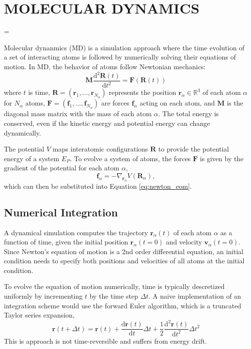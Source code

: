 \chapter{MOLECULAR DYNAMICS}
\label{ch:md}
\hfuzz=20pt
\vfuzz=20pt
\vbadness=\maxdimen

Molecular dynanmics (MD) is a simulation approach where the time evolution of a set of interacting atoms is followed by numerically solving their equations of motion.  In MD, the behavior of atoms follow Newtonian mechanics:
\begin{equation}
	  \label{eq:newton_eom}
    \bm{M}\frac{\mathrm{d}^2\bm{R}(t)}
		           {\mathrm{d} t^2}
		=
		\bm{F}(\bm{R}(t))
\end{equation}
where $t$ is time,
$\bm{R} = (\bm{r}_1,...,\bm{r}_{N_\alpha})$ represents the position $\bm{r}_\alpha \in \mathbb{R}^3$ of each atom $\alpha$ for $N_\alpha$ atoms,
$\bm{F} = (\bm{f}_1,...,\bm{f}_{N_\alpha})$ are forces $\bm{f}_\alpha$ acting on each atom,
and $\bm{M}$ is the diagonal mass matrix with the mass of each atom $\alpha$.
The total energy is conserved, even if the kinetic energy and potential energy can change dynamically.

The potential $V$ maps interatomic configurations $\bm{R}$ to provide the potential energy of a system $E_P$.  To evolve a system of atoms, the forces $\bm{F}$ is given by the gradient of the potential for each atom $\alpha$,
\begin{equation}
	\label{eq:calc_forces_from_potential}
	 \bm{f}_\alpha
	 =
	 -\nabla_{\bm{r}_\alpha} V(\bm{R}_\alpha),
\end{equation}
 which can then be substituted into Equation \ref{eq:newton_eom}.

\section{Numerical Integration}
A dynamical simulation computes the trajectory $\bm{r}_\alpha(t)$ of each atom $\alpha$ as a function of time, given the initial position $\bm{r}_\alpha(t=0)$ and velocity $\bm{v}_\alpha(t=0)$.  Since Newton's equation of motion is a 2nd order differential equation, an initial condition needs to specify both positions and velocities of all atoms at the initial condition.

To evolve the equation of motion numerically, time is typically descretized uniformly by incrementing $t$ by the time step $\Delta t$.  A naive implementation of an integration scheme would use the forward Euler algorithm, which is a truncated Taylor series expansion,
\begin{equation}
	\bm{r}(t+\Delta t)
	=
	\bm{r}(t)
	+ \frac{\mathrm{d} \bm{r}(t)}
	       {\mathrm{d}t}
		\Delta t
	+ \frac{1}{2}
	  \frac{\mathrm{d}^2 \bm{r}(t)}
		     {\mathrm{d}t^2}
		\Delta t^2
\end{equation}
This is approach is not time-reversible and suffers from energy drift\cite{allen1987_md}.

